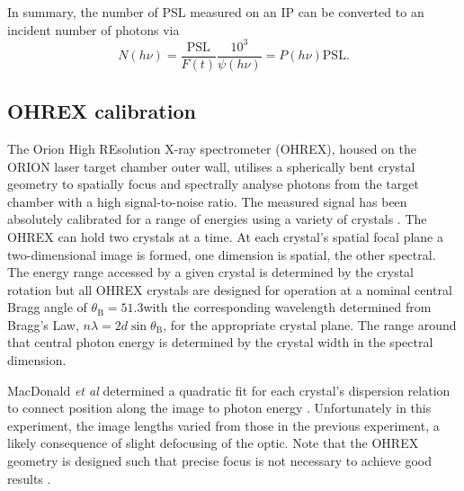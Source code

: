 In summary, the number of PSL measured on an IP can be converted to an incident number of photons via
\begin{equation}
	N(h\nu) = \frac{\mathrm{PSL}}{F(t)}\frac{10^3}{\psi(h\nu)} = P(h\nu) \mathrm{PSL}.
\end{equation}

\subsection{OHREX calibration}
The Orion High REsolution X-ray spectrometer (OHREX), housed on the ORION laser target chamber outer wall, utilises a spherically bent crystal geometry to spatially focus and spectrally analyse photons from the target chamber \cite{beiersdorferLineshapeSpectroscopyVery2016} with a high signal-to-noise ratio. The measured signal has been absolutely calibrated for a range of energies using a variety of crystals \cite{macdonaldAbsoluteThroughputCalibration2021}. The OHREX can hold two crystals at a time. At each crystal's spatial focal plane a two-dimensional image is formed, one dimension is spatial, the other spectral. The energy range accessed by a given crystal is determined by the crystal rotation but all OHREX crystals are designed for operation at a nominal central Bragg angle of $\theta_\mathrm{B} = 51.3$\degree with the corresponding wavelength determined from Bragg's Law, $n\lambda = 2d\sin\theta_\mathrm{B}$, for the appropriate crystal plane. The range around that central photon energy is determined by the crystal width in the spectral dimension.

MacDonald \textit{et al} determined a quadratic fit for each crystal's dispersion relation to connect position along the image to photon energy \cite{macdonaldAbsoluteThroughputCalibration2021}. Unfortunately in this experiment, the image lengths varied from those in the previous experiment, a likely consequence of slight defocusing of the optic. Note that the OHREX geometry is designed such that precise focus is not necessary to achieve good results \cite{beiersdorferLineshapeSpectroscopyVery2016}.

